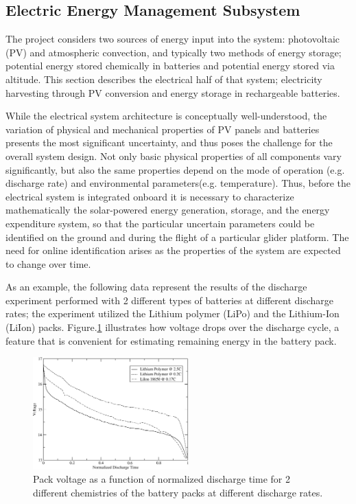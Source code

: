 \documentclass{ifacconf}
\newcommand{\squeezeup}{\vspace{-2.0mm}}
\begin{document}
\subsection{Electric Energy Management Subsystem}
\label{subsec:Electric} \squeezeup

The project considers two sources of energy input into the system:
photovoltaic (PV) and atmospheric convection, and typically two methods of
energy storage; potential energy stored chemically in batteries and potential
energy stored via altitude. This section describes the electrical half of
that system; electricity harvesting through PV conversion and energy storage
in rechargeable batteries.

While the electrical system architecture is conceptually well-understood, the
variation of physical and mechanical properties of PV panels and batteries
presents the most significant uncertainty, and thus poses the challenge for
the overall system design. Not only basic physical properties of all
components vary significantly, but also the same properties depend on the
mode of operation (e.g. discharge rate) and environmental parameters(e.g.
temperature). Thus, before the electrical system is integrated onboard it is
necessary to characterize mathematically the solar-powered energy generation,
storage, and the energy expenditure system, so that the particular uncertain
parameters could be identified on the ground and during the flight of a
particular glider platform. The need for online identification arises as the
properties of the system are expected to change over time.

As an example, the following data represent the results of the discharge
experiment performed with 2 different types of batteries at different
discharge rates; the experiment utilized the Lithium polymer (LiPo) and the
Lithium-Ion (LiIon) packs. Figure.\ref{fig:Batt_v_vs_t} illustrates how
voltage drops over the discharge cycle, a feature that is convenient for
estimating remaining energy in the battery pack.
\begin{figure}[thbp]
  \centering
  \includegraphics[width=6cm]{Figures/V_versus_T_mod.eps}
  \caption{Pack voltage as a function of normalized discharge time for
  2 different chemistries of the   battery packs at different discharge rates.}
  \label{fig:Batt_v_vs_t}
\end{figure}
\end{document}
